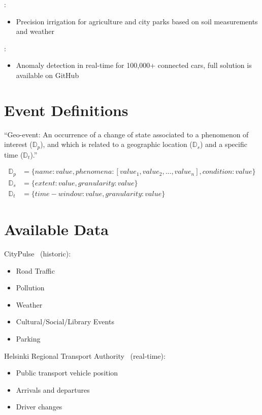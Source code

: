 \documentclass[parskip=half]{scrartcl}
\begin{document}
\cite[p.~1]{Garcia.2020}:
\begin{itemize}
	\item Precision irrigation for agriculture and city parks based on soil measurements and weather
\end{itemize}

\cite{Wahner.2019}:
\begin{itemize}
	\item Anomaly detection in real-time for 100,000+ connected cars, full solution is available on GitHub
\end{itemize}


\section{Event Definitions}

\enquote{Geo-event: An occurrence of a change of state associated to a phenomenon of interest ($\mathbb{D}_p$), and which is related to a geographic location ($\mathbb{D}_s$) and a specific time ($\mathbb{D}_t$).}~\cite[p.~3]{Morales.2015}

\begin{align*}
	\mathbb{D}_p &= \{name: value, phenomena: [value_1, value_2, ..., value_n], condition: value\} \\
	\mathbb{D}_s &= \{extent: value, granularity: value\} \\
	\mathbb{D}_t &= \{time-window: value, granularity: value\}
\end{align*}


\section{Available Data}

CityPulse~\cite{CityPulse.2015} (historic):
\begin{itemize}
	\item Road Traffic
	\item Pollution
	\item Weather
	\item Cultural/Social/Library Events
	\item Parking
\end{itemize}

Helsinki Regional Transport Authority~\cite{HelsinkiRegionalTransportAuthority.2020} (real-time):
\begin{itemize}
	\item Public transport vehicle position
	\item Arrivals and departures
	\item Driver changes
\end{itemize}
\end{document}
